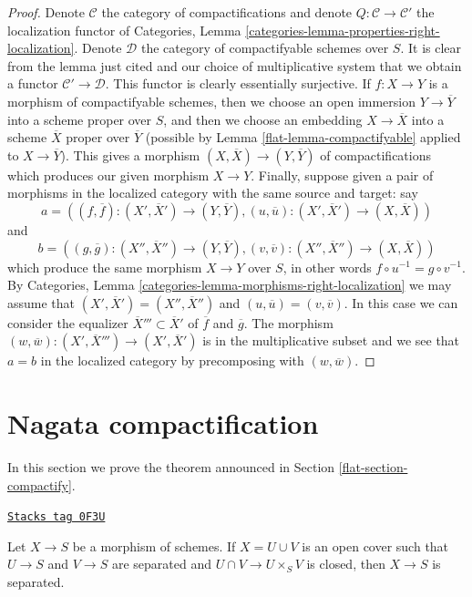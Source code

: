 \begin{proof}

Denote $\mathcal{C}$ the category of compactifications and
denote $Q : \mathcal{C} \to \mathcal{C}'$ the localization
functor of Categories, Lemma
\ref{categories-lemma-properties-right-localization}.
Denote $\mathcal{D}$ the category of compactifyable schemes
over $S$. It is clear from the lemma just cited and our
choice of multiplicative system that we
obtain a functor $\mathcal{C}' \to \mathcal{D}$.
This functor is clearly essentially surjective.
If $f : X \to Y$ is a morphism of compactifyable
schemes, then we choose an open immersion $Y \to \overline{Y}$
into a scheme proper over $S$, and then we choose an embedding
$X \to \overline{X}$ into a scheme $\overline{X}$ proper over
$\overline{Y}$ (possible by Lemma \ref{flat-lemma-compactifyable}
applied to $X \to \overline{Y}$). This gives a morphism
$(X, \overline{X}) \to (Y, \overline{Y})$ of compactifications
which produces our given morphism $X \to Y$.
Finally, suppose given a pair of morphisms in the
localized category with the same source and target: say
$$
a = ((f, \overline{f}) : (X', \overline{X}') \to (Y, \overline{Y}),
(u, \overline{u}) : (X', \overline{X}') \to (X, \overline{X}))
$$
and
$$
b = ((g, \overline{g}) : (X'', \overline{X}'') \to (Y, \overline{Y}),
(v, \overline{v}) : (X'', \overline{X}'') \to (X, \overline{X}))
$$
which produce the same morphism $X \to Y$ over $S$, in other words
$f \circ u^{-1} = g \circ v^{-1}$. By
Categories, Lemma \ref{categories-lemma-morphisms-right-localization}
we may assume that $(X', \overline{X}') = (X'', \overline{X}'')$
and $(u, \overline{u}) = (v, \overline{v})$. In this case we
can consider the equalizer $\overline{X}''' \subset \overline{X}'$
of $\overline{f}$ and $\overline{g}$. The morphism
$(w, \overline{w}) : (X', \overline{X}''') \to (X', \overline{X}')$ is in
the multiplicative subset and we see that $a = b$ in the localized
category by precomposing with $(w, \overline{w})$.
\end{proof}

\section{Nagata compactification}
\label{flat-section-compactifications}
In this section we prove the theorem announced in
Section \ref{flat-section-compactify}.

\begin{lemma}
\label{flat-lemma-check-separated}
\href{https://stacks.math.columbia.edu/tag/0F3U}{\texttt{Stacks tag 0F3U}}

Let $X \to S$ be a morphism of schemes. If $X = U \cup V$
is an open cover such that $U \to S$ and $V \to S$ are separated
and $U \cap V \to U \times_S V$ is closed, then
$X \to S$ is separated.
\end{lemma}

